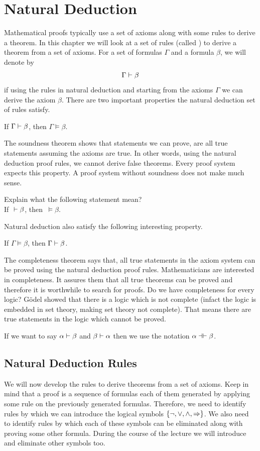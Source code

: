 \chapter{Natural Deduction}
Mathematical proofs typically use a set of axioms along with some rules to derive a theorem. In this chapter we will look at a set of rules (called ) to derive a theorem from a set of axioms. For a set of formulas $\Gamma$ and a formula $\beta$, we will denote by 
\[
\Gamma \vdash \beta
\]
if using the rules in natural deduction and starting from the axioms $\Gamma$ we can derive the axiom $\beta$. There are two important properties the natural deduction set of rules satisfy.

\begin{theorem}[Soundness]
If $\Gamma \vdash \beta$, then $\Gamma \models \beta$.
\end{theorem}

The soundness theorem shows that statements we can prove, are all true statements assuming the axioms are true. In other words, using the natural deduction proof rules, we cannot derive false theorems. Every proof system expects this property. A proof system without soundness does not make much sense. 
\begin{exercise}
Explain what the following statement mean? \\
If \true $~\vdash \beta$, then \true $~\models \beta$.
\end{exercise} 

Natural deduction also satisfy the following interesting property. 
\begin{theorem}[Completness]
If $\Gamma \models \beta$, then $\Gamma \vdash \beta$.
\end{theorem}
The completeness theorem says that, all true statements in the axiom system can be proved using the natural deduction proof rules. Mathematicians are interested in completeness. It assures them that all true theorems can be proved and therefore it is worthwhile to search for proofs. Do we have completeness for every logic? G\"odel showed that there is a logic which is not complete (infact the logic is embedded in set theory, making set theory not complete). That means there are true statements in the logic which cannot be proved.

If we want to say $\alpha \vdash \beta$ and $\beta \vdash \alpha$ then we use the notation $\alpha \dashv \vdash \beta$. 

\section{Natural Deduction Rules}
We will now develop the rules to derive theorems from a set of axioms. Keep in mind that a proof is a sequence of formulas each of them generated by applying some rule on the previously generated formulas. Therefore, we need to identify rules by which we can introduce the logical symbols $\{\neg, \vee, \wedge, \Rightarrow\}$. We also need to identify rules by which each of these symbols can be eliminated along with proving some other formula. During the course of the lecture we will introduce and eliminate other symbols too.

